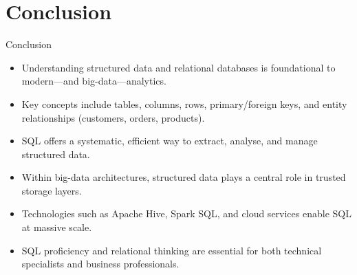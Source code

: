 \documentclass[aspectratio=169, table]{beamer}
\begin{document}
\section{Conclusion}
\begin{frame}{Conclusion}
\vspace{20pt}

\begin{itemize}
\item Understanding structured data and relational databases is foundational to modern—and big-data—analytics.
\item Key concepts include tables, columns, rows, primary/foreign keys, and entity relationships (customers, orders, products).
\item SQL offers a systematic, efficient way to extract, analyse, and manage structured data.
\item Within big-data architectures, structured data plays a central role in trusted storage layers.
\item Technologies such as Apache Hive, Spark SQL, and cloud services enable SQL at massive scale.
\item SQL proficiency and relational thinking are essential for both technical specialists and business professionals.
\end{itemize}
\end{frame}
\end{document}
